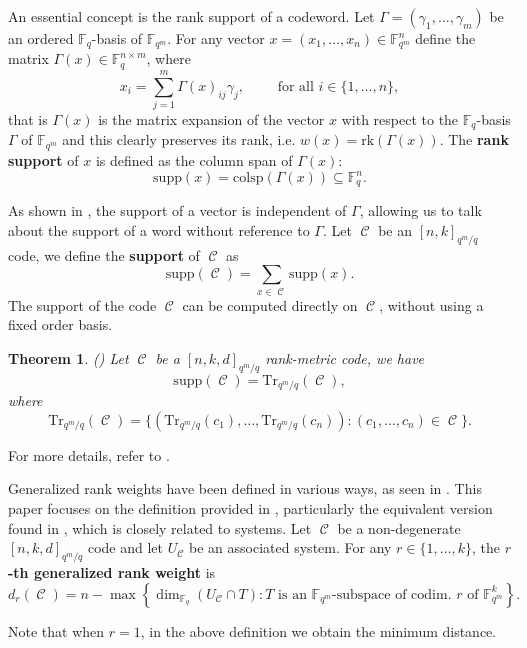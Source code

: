 \documentclass[11pt]{amsart}
\DeclareMathOperator{\C}{\mathcal{C}}
\newtheorem{theorem}{Theorem}[section]
\newcommand{\F}{{\mathbb F}}
\newcommand{\fq}{{\mathbb F}_{q}}
\begin{document}
An essential concept is the rank support of a codeword.
Let $\Gamma=(\gamma_1,\ldots,\gamma_m)$ be an ordered $\fq$-basis of $\F_{q^m}$. For any vector $x=(x_1, \ldots ,x_n) \in \F_{q^m}^n$ define the matrix $\Gamma(x)\in \F_{q}^{n \times m}$, where
$$x_{i} = \sum_{j=1}^m \Gamma (x)_{ij}\gamma_j, \qquad \mbox{ for all } i \in \{1,\ldots,n\},$$
that is $\Gamma(x)$ is the matrix expansion of the vector $x$ with respect to the $\fq$-basis $\Gamma$ of $\F_{q^m}$ and this clearly preserves its rank, i.e. $w(x)=\mathrm{rk}(\Gamma(x))$.
The \textbf{rank support} of $x$ is defined as the column span of $\Gamma(x)$:
$$\mathrm{supp}(x)=\mathrm{colsp}(\Gamma(x)) \subseteq \fq^n.$$

As shown in \cite[Proposition 2.1]{alfarano2021linearcutting}, the support of a vector is independent of $\Gamma$, allowing us to talk about the support of a word without reference to $\Gamma$.
Let $\C$ be an $[n,k]_{q^m/q}$ code, we define the \textbf{support} of $\C$ as
\[ \mathrm{supp}(\C)=\sum_{x \in \C} \mathrm{supp}(x). \]
The support of the code $\C$ can be computed directly on $\C$, without using a fixed order basis.

\begin{theorem}\label{thm:traceandsupport}(\cite[Theorem 16]{jurrius2017defining})
Let $\C$ be a $[n,k,d]_{q^m/q}$ rank-metric code, we have
\[ \mathrm{supp}(\C)=\mathrm{Tr}_{q^m/q}(\C), \]
where
\[ \mathrm{Tr}_{q^m/q}(\C)=\{ (\mathrm{Tr}_{q^m/q}(c_1),\ldots,\mathrm{Tr}_{q^m/q}(c_n)) \colon (c_1,\ldots,c_n) \in \C \}. \]
\end{theorem}

For more details, refer to \cite{martinez2017relative}.

Generalized rank weights have been defined in various ways, as seen in \cite{jurrius2017defining}. This paper focuses on the definition provided in \cite{Randrianarisoa2020ageometric}, particularly the equivalent version found in \cite[Theorem 3.14]{alfarano2021linearcutting}, which is closely related to systems.
Let $\C$ be a non-degenerate $[n,k,d]_{q^m/q}$ code and let $U_{\C}$ be an associated system.
For any $r \in \{1,\ldots,k\}$, the \textbf{$r$-th generalized rank weight} is
\begin{equation}\label{eq:defgenrankweight}
d_r(\C)=n - \max\left\{ \dim_{\fq}(U_{\C} \cap T)  \colon T\mbox{ is an } \F_{q^m}\mbox{-subspace of codim. $r$ of  }\F_{q^m}^k  \right\}.
\end{equation}

Note that when $r=1$, in the above definition we obtain the minimum distance.
\end{document}
